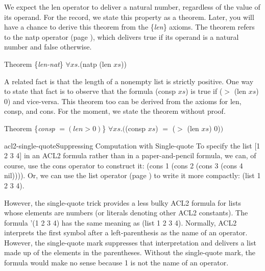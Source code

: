 We expect the \textsf{len} operator to deliver a natural number,
regardless of the value of its operand.
For the record, we state this property as a theorem.
Later, you will have a chance to derive
this theorem from the \{\emph{len}\} axioms.
The theorem refers to the \textsf{natp} operator
(page \pageref{natp-op}),
which delivers true if its operand is a natural number and false otherwise.
\begin{samepage}
\label{len-nat-thm}
\begin{center}
Theorem \{\emph{len-nat}\} $\forall xs.$\textsf{(natp (len $xs$))}
\end{center}
\end{samepage}

A related fact is that the length of a nonempty list is strictly positive.
One way to state that fact is to observe that the formula \textsf{(consp $xs$)} is true
if \textsf{($>$ (len $xs$) 0)} and vice-versa. %
This theorem too can be derived from the axioms for
\textsf{len}, \textsf{consp}, and \textsf{cons}.
For the moment, we state the theorem without proof.
\begin{samepage}
\label{consp-len-thm}
\begin{center}
Theorem \{\emph{consp} $= (len > 0)$\} $\forall xs.($\textsf{(consp $xs$)} $=$ \textsf{($>$ (len $xs$) 0)}$)$
\end{center}
\end{samepage}

\begin{aside}{acl2-single-quote}{Suppressing Computation with Single-quote}
To specify the list \textsf{[1 2 3 4]} in an ACL2 formula
rather than in a paper-and-pencil formula,
we can, of course, use the \textsf{cons} operator to construct it:
\textsf{(cons 1 (cons 2 (cons 3 (cons 4 nil))))}.
Or, we can use the \textsf{list} operator (page \pageref{list-op-informal}) to write it more compactly:
\textsf{(list 1 2 3 4)}.

However, the single-quote trick provides a less bulky ACL2 formula for lists
whose elements are numbers (or literals denoting other ACL2 constants).
The formula
\textsf{'(1 2 3 4)} has the same meaning as \textsf{(list 1 2 3 4)}.
Normally, ACL2 interprets the first symbol after a left-parenthesis
as the name of an operator.
However, the single-quote mark suppresses that interpretation and
delivers a list made up of the elements in the parentheses.
Without the single-quote mark,
the formula would make no sense because 1 is not the name of an
operator.
\end{aside}

